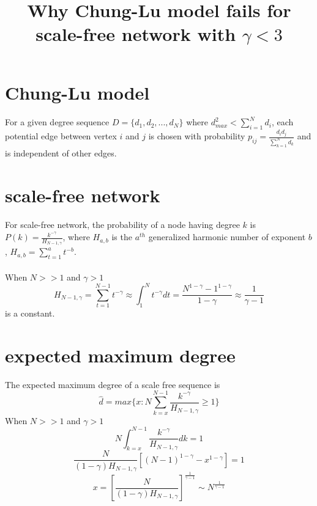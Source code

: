 \documentclass{article}
\title{Why Chung-Lu model fails for scale-free network with $\gamma<3$}
\begin{document}
\maketitle

\section{Chung-Lu model}
\paragraph{}
For a given degree sequence $D=\{d_1, d_2, ...,d_N\}$ where $d_{max}^2 < \sum_{i=1}^N d_i$, each potential edge between vertex $i$ and $j$ is chosen with probability $p_{ij}=\frac{d_i d_j}{\sum_{k=1}^N d_k}$ and is independent of other edges.\cite{ChungLu}

\section{scale-free network}
\paragraph{}
For scale-free network, the probability of a node having degree $k$ is $P(k)=\frac{k^{-\gamma}}{H_{N-1,\gamma}}$, where $H_{a,b}$ is the $a^{th}$ generalized harmonic number of exponent $b$, $H_{a,b}=\sum_{t=1}^a t^{-b}$.
\paragraph{}
When $N>>1$ and $\gamma > 1$
\begin{equation}
H_{N-1,\gamma}=\sum_{t=1}^{N-1}t^{-\gamma} \approx \int_{1}^{N} t^{-\gamma} dt = \frac{N^{1-\gamma}-1^{1-\gamma}}{1-\gamma} \approx \frac{1}{\gamma-1}
\end{equation}
is a constant.

\section{expected maximum degree}
The expected maximum degree of a scale free sequence is \cite{ScaleFreeSparse}
\begin{equation}
\hat{d}=max\{x: N\sum_{k=x}^{N-1}\frac{k^{-\gamma}}{H_{N-1,\gamma}} \geq 1\}
\end{equation}
When $N>>1$ and $\gamma>1$
\begin{equation}
N\int_{k=x}^{N-1}\frac{k^{-\gamma}}{H_{N-1,\gamma}} dk =1
\end{equation}
\begin{equation}
\frac{N}{(1-\gamma)H_{N-1,\gamma}}[(N-1)^{1-\gamma}-x^{1-\gamma}]=1
\end{equation}
\begin{equation}
x=[\frac{N}{(1-\gamma)H_{N-1,\gamma}}]^{\frac{1}{\gamma-1}} \sim N^{\frac{1}{\gamma-1}}
\end{equation}
\end{document}
